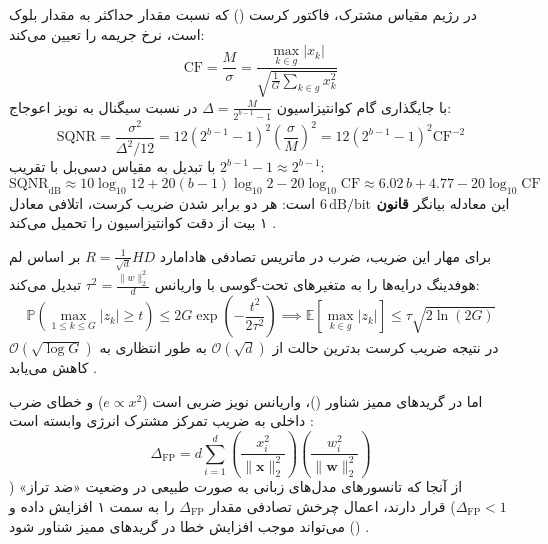در رژیم مقیاس مشترک، فاکتور کرست () که نسبت مقدار حداکثر به مقدار  بلوک است، نرخ جریمه را تعیین می‌کند:
\begin{equation}
    \mathrm{CF} = \frac{M}{\sigma} = \frac{\max_{k \in g} |x_k|}{\sqrt{\frac{1}{G} \sum_{k \in g} x_k^2}}
\end{equation}
با جایگذاری گام کوانتیزاسیون $\Delta = \frac{M}{2^{b-1}-1}$ در نسبت سیگنال به نویز اعوجاج:
\begin{equation}
    \text{SQNR} = \frac{\sigma^2}{\Delta^2/12} = 12 (2^{b-1}-1)^2 \left(\frac{\sigma}{M}\right)^2 = 12 (2^{b-1}-1)^2 \mathrm{CF}^{-2}
\end{equation}
با تبدیل به مقیاس دسی‌بل با تقریب $2^{b-1}-1 \approx 2^{b-1}$:
\begin{equation}
    \text{SQNR}_{\text{dB}} \approx 10 \log_{10} 12 + 20(b-1)\log_{10} 2 - 20 \log_{10} \mathrm{CF} \approx 6.02 \, b + 4.77 - 20 \log_{10} \mathrm{CF}
\end{equation}
این معادله بیانگر \textbf{قانون $6\,\mathrm{dB}/\text{bit}$} است: هر دو برابر شدن ضریب کرست، اتلافی معادل ۱ بیت از دقت کوانتیزاسیون را تحمیل می‌کند \cite{jokar2026transforms}.

برای مهار این ضریب، ضرب در ماتریس تصادفی هادامارد $R = \frac{1}{\sqrt{d}} H D$ بر اساس لم هوفدینگ درایه‌ها را به متغیرهای تحت-گوسی با واریانس $\tau^2 = \frac{\|w\|_2^2}{d}$ تبدیل می‌کند:
\begin{equation}
    \mathbb{P}\left(\max_{1 \le k \le G} |z_k| \ge t\right) \le 2G \exp\left(-\frac{t^2}{2\tau^2}\right) \implies \mathbb{E}[\max_{k \in g} |z_k|] \le \tau \sqrt{2 \ln(2G)}
\end{equation}
در نتیجه ضریب کرست بدترین حالت از $\mathcal{O}(\sqrt{d})$ به طور انتظاری به $\mathcal{O}(\sqrt{\log G})$ کاهش می‌یابد \cite{jokar2026transforms}.

اما در گرید‌های ممیز شناور ()، واریانس نویز ضربی است ($e \propto x^2$) و خطای ضرب داخلی به ضریب تمرکز مشترک انرژی وابسته است \cite{ordentlich2026high1, whalen2026kbbq}:
\begin{equation}
    \Delta_{\text{FP}} = d \sum_{i=1}^d \left(\frac{x_i^2}{\|\mathbf{x}\|_2^2}\right)\left(\frac{w_i^2}{\|\mathbf{w}\|_2^2}\right)
\end{equation}
از آنجا که تانسورهای مدل‌های زبانی به صورت طبیعی در وضعیت «ضد تراز» ($\Delta_{\text{FP}} < 1$) قرار دارند، اعمال چرخش تصادفی مقدار $\Delta_{\text{FP}}$ را به سمت ۱ افزایش داده و می‌تواند موجب افزایش خطا در گرید‌های ممیز شناور شود () \cite{jokar2026transforms, whalen2026kbbq}.

